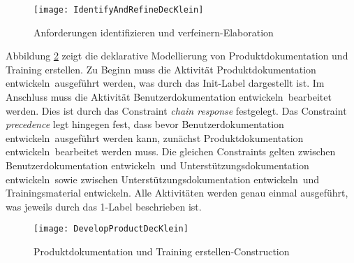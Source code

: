 \begin{figure}[h]
\begin{center}
  \texttt{[image: IdentifyAndRefineDecKlein]} %
  \caption{Anforderungen identifizieren und verfeinern-Elaboration}
  \label{fig:IdentifyAndRefineDecKlein}
\end{center}
\end{figure}



Abbildung \ref{fig:DevelopProductDecKlein} zeigt die deklarative Modellierung von Produktdokumentation und Training erstellen.
Zu Beginn muss die Aktivität \grqq Produktdokumentation entwickeln\grqq \ ausgeführt werden, was durch das Init-Label dargestellt ist. Im Anschluss muss die Aktivität \grqq Benutzerdokumentation entwickeln\grqq \ bearbeitet werden. Dies ist durch das Constraint \textit{chain response} festgelegt. Das Constraint \textit{precedence} legt hingegen fest, dass bevor \grqq Benutzerdokumentation entwickeln\grqq \ ausgeführt werden kann, zunächst \grqq Produktdokumentation entwickeln\grqq \ bearbeitet werden muss. Die gleichen Constraints gelten zwischen \grqq Benutzerdokumentation entwickeln\grqq \ und \grqq Unterstützungsdokumentation entwickeln\grqq \ sowie zwischen \grqq Unterstützungsdokumentation entwickeln\grqq \ und \grqq Trainingsmaterial entwickeln\grqq. Alle Aktivitäten werden genau einmal ausgeführt, was jeweils durch das 1-Label beschrieben ist. 

\begin{figure}[htp]
\begin{center}
  \texttt{[image: DevelopProductDecKlein]} %
  \caption{Produktdokumentation und Training erstellen-Construction}
  \label{fig:DevelopProductDecKlein}
\end{center}
\end{figure}

